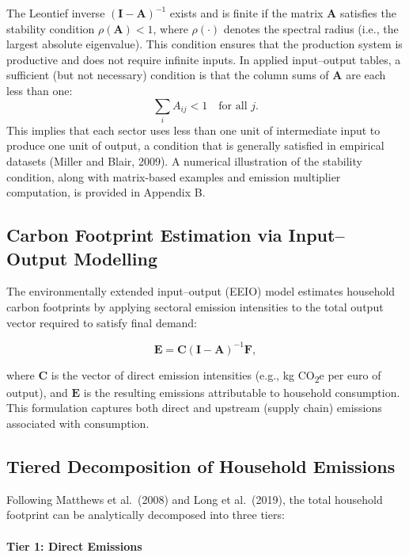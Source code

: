 \documentclass[12pt,a4paper]{article}%
\begin{document}
The Leontief inverse \( {(\mathbf{I} - \mathbf{A})}^{-1} \) exists and is finite if the matrix \( \mathbf{A} \) satisfies the stability condition \( \rho(\mathbf{A}) < 1 \), where \( \rho(\cdot) \) denotes the spectral radius (i.e., the largest absolute eigenvalue). This condition ensures that the production system is productive and does not require infinite inputs. In applied input--output tables, a sufficient (but not necessary) condition is that the column sums of \( \mathbf{A} \) are each less than one:
\[
\sum_i A_{ij} < 1 \quad \text{for all } j.
\]
This implies that each sector uses less than one unit of intermediate input to produce one unit of output, a condition that is generally satisfied in empirical datasets (Miller and Blair, 2009). A numerical illustration of the stability condition, along with matrix-based examples and emission multiplier computation, is provided in Appendix B.

\subsection{Carbon Footprint Estimation via Input–Output Modelling}

The environmentally extended input–output (EEIO) model estimates household carbon footprints by applying sectoral emission intensities to the total output vector required to satisfy final demand:

\begin{equation}
\mathbf{E} = \mathbf{C} {(\mathbf{I} - \mathbf{A})}^{-1} \mathbf{F},
\end{equation}

where \( \mathbf{C} \) is the vector of direct emission intensities (e.g., kg CO\textsubscript{2}e per euro of output), and \( \mathbf{E} \) is the resulting emissions attributable to household consumption. This formulation captures both direct and upstream (supply chain) emissions associated with consumption.

\subsection{Tiered Decomposition of Household Emissions}

Following Matthews et al.~(2008) and Long et al.~(2019), the total household footprint can be analytically decomposed into three tiers:

\paragraph{Tier 1: Direct Emissions}
\end{document}
